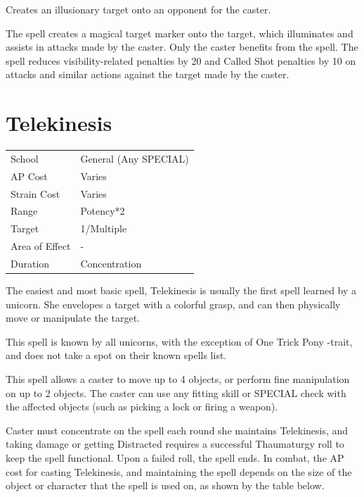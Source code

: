 \documentclass[11pt,a4paper,twocolumn]{book}
\begin{document}
\medskip

Creates an illusionary target onto an opponent for the caster.

The spell creates a magical target marker onto the target, which illuminates and assists in attacks made by the caster. Only the caster benefits from the spell. The spell reduces visibility-related penalties by 20 and Called Shot penalties by 10 on attacks and similar actions against the target made by the caster.


\section*{Telekinesis}
{
	\begin{tabu} to 75mm{| X[l,4] | X[l,7] |}
		\hline
		School 			& General (Any SPECIAL) 		\\
        AP Cost	      	& Varies 						\\
        Strain Cost     & Varies 						\\
        Range     		& Potency*2 					\\
        Target      	& 1/Multiple					\\
        Area of Effect  & - 	 						\\
        Duration     	& Concentration					\\ \hline
	\end{tabu}
		
}

\medskip

The easiest and most basic spell, Telekinesis is usually the first spell learned by a unicorn. She envelopes a target with a colorful grasp, and can then physically move or manipulate the target.

This spell is known by all unicorns, with the exception of One Trick Pony -trait, and does not take a spot on their known spells list.

This spell allows a caster to move up to 4 objects, or perform fine manipulation on up to 2 objects. The caster can use any fitting skill or SPECIAL check with the affected objects (such as picking a lock or firing a weapon).

Caster must concentrate on the spell each round she maintains Telekinesis, and taking damage or getting Distracted requires a successful Thaumaturgy roll to keep the spell functional. Upon a failed roll, the spell ends.
In combat, the AP cost for casting Telekinesis, and maintaining the spell depends on the size of the object or character that the spell is used on, as shown by the table below.
\end{document}
